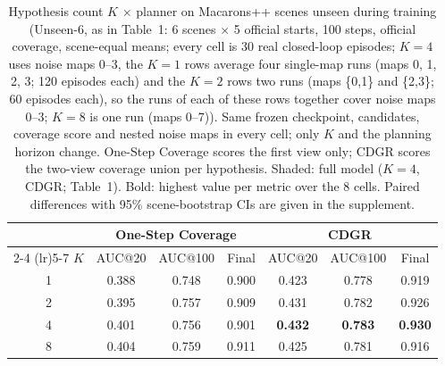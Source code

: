 \begin{table}[t]
\centering
\footnotesize
\setlength{\tabcolsep}{3.6pt}
\newcommand{\fullm}[1]{{\setlength{\fboxsep}{1pt}\colorbox{gray!18}{#1}}}
\begin{tabular}{@{}cccc@{\hspace{6pt}}ccc@{}}
\toprule
 & \multicolumn{3}{c}{\textbf{One-Step Coverage}} & \multicolumn{3}{c}{\textbf{CDGR}} \\
\cmidrule(lr){2-4} \cmidrule(lr){5-7}
$K$ & AUC@20 & AUC@100 & Final & AUC@20 & AUC@100 & Final \\
\midrule
1 & 0.388 & 0.748 & 0.900 & 0.423 & 0.778 & 0.919 \\
2 & 0.395 & 0.757 & 0.909 & 0.431 & 0.782 & 0.926 \\
4 & 0.401 & 0.756 & 0.901 & \fullm{\textbf{0.432}} & \fullm{\textbf{0.783}} & \fullm{\textbf{0.930}} \\
8 & 0.404 & 0.759 & 0.911 & 0.425 & 0.781 & 0.916 \\
\bottomrule
\end{tabular}
\caption{Hypothesis count $K$ $\times$ planner on Macarons++ scenes unseen during training (Unseen-6, as in Table~1: 6 scenes $\times$ 5 official starts, 100 steps, official coverage, scene-equal means; every cell is 30 real closed-loop episodes; $K{=}4$ uses noise maps 0--3, the $K{=}1$ rows average four single-map runs (maps 0, 1, 2, 3; 120 episodes each) and the $K{=}2$ rows two runs (maps \{0,1\} and \{2,3\}; 60 episodes each), so the runs of each of these rows together cover noise maps 0--3; $K{=}8$ is one run (maps 0--7)). Same frozen checkpoint, candidates, coverage score and nested noise maps in every cell; only $K$ and the planning horizon change. One-Step Coverage scores the first view only; CDGR scores the two-view coverage union per hypothesis. Shaded: full model ($K{=}4$, CDGR; Table~1). Bold: highest value per metric over the 8 cells. Paired differences with 95\% scene-bootstrap CIs are given in the supplement.}
\label{tab:ablation_hypotheses_planning}
\end{table}
